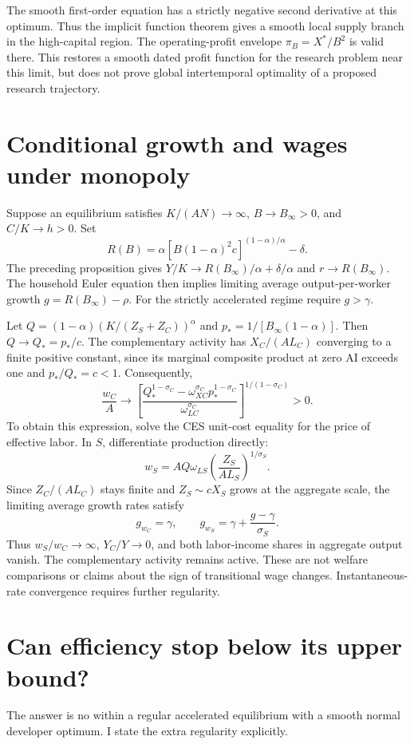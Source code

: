\documentclass[11pt]{article}
\begin{document}
The smooth first-order equation has a strictly negative second derivative
at this optimum. Thus the implicit function theorem gives a smooth local
supply branch in the high-capital region. The operating-profit envelope
$\pi_B=X^*/B^2$ is valid there. This restores a smooth dated profit function
for the research problem near this limit, but does not prove global
intertemporal optimality of a proposed research trajectory.

\section{Conditional growth and wages under monopoly}
Suppose an equilibrium satisfies $K/(AN)\to\infty$, $B\to B_\infty>0$,
and $C/K\to h>0$. Set
\[
 R(B)=\alpha[B(1-\alpha)^2c]^{(1-\alpha)/\alpha}-\delta.
\]
The preceding proposition gives $Y/K\to R(B_\infty)/\alpha+\delta/\alpha$
and $r\to R(B_\infty)$. The household Euler equation then implies limiting
average output-per-worker growth $g=R(B_\infty)-\rho$.
For the strictly accelerated regime require $g>\gamma$.

Let $Q=(1-\alpha)(K/(Z_S+Z_C))^\alpha$ and
$p_*=1/[B_\infty(1-\alpha)]$. Then $Q\to Q_*=p_*/c$.
The complementary activity has $X_C/(AL_C)$ converging to a finite positive
constant, since its marginal composite product at zero AI exceeds one
and $p_*/Q_*=c<1$. Consequently,
\begin{equation}
 \frac{w_C}{A}\to
 \left[\frac{Q_*^{1-\sigma_C}-\omega_{XC}^{\sigma_C}p_*^{1-\sigma_C}}
 {\omega_{LC}^{\sigma_C}}\right]^{1/(1-\sigma_C)}>0.
 \label{eq:selection-C-wage}
\end{equation}
To obtain this expression, solve the CES unit-cost equality for the price
of effective labor. In $S$, differentiate production directly:
\[
 w_S=AQ\omega_{LS}\left(\frac{Z_S}{AL_S}\right)^{1/\sigma_S}.
\]
Since $Z_C/(AL_C)$ stays finite and $Z_S\sim cX_S$ grows at the aggregate
scale, the limiting average growth rates satisfy
\begin{equation}
 \boxed{g_{w_C}=\gamma,\qquad
 g_{w_S}=\gamma+\frac{g-\gamma}{\sigma_S}.}
 \label{eq:selection-wages}
\end{equation}
Thus $w_S/w_C\to\infty$, $Y_C/Y\to0$, and both labor-income shares in
aggregate output vanish. The complementary activity remains active.
These are not welfare comparisons or claims about the sign of transitional
wage changes. Instantaneous-rate convergence requires further regularity.

\section{Can efficiency stop below its upper bound?}
The answer is no within a regular accelerated equilibrium with a smooth
normal developer optimum. I state the extra regularity explicitly.
\end{document}

